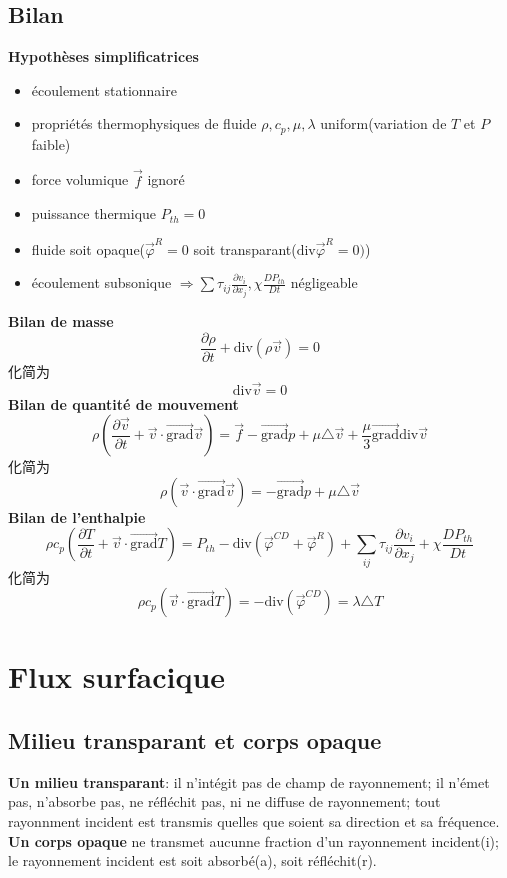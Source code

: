 \documentclass[openany]{book}
\begin{document}
\subsection{Bilan}
\textbf{Hypoth\`eses simplificatrices}
\begin{itemize}
\item \'ecoulement stationnaire
\item propri\'et\'es thermophysiques de fluide $\rho, c_p, \mu,\lambda $ uniform(variation de $T$ et $P$ faible)
\item force volumique $\vec{f}$ ignor\'e
\item puissance thermique $P_{th}=0$
\item fluide soit opaque($\vec{\varphi}^R = 0$ soit transparant($\mbox{div} \vec{\varphi}^R=0)$)
\item \'ecoulement subsonique $\Rightarrow \sum \tau_{ij}\frac{\partial  v_i}{\partial x_j},\chi\frac{ DP_{th}}{Dt}$ n\'egligeable
\end{itemize}
\textbf{Bilan de masse}
$$\frac{\partial  \rho}{\partial t} + \mbox{div} (\rho \vec{v})=0 $$
化简为
$$\mbox{div} \vec{v}=0$$
\textbf{Bilan de quantit\'e de mouvement}
$$
\rho(\frac{\partial  \vec{v}}{\partial t}+ \vec{v}\cdot \vec{\mbox{grad}}\vec{v}) =  \vec{f} - \vec{\mbox{grad}} p + \mu \triangle\vec{v} + \frac{\mu}{3}\vec{\mbox{grad}} \mbox{div} \vec{v}
$$
化简为
$$
\rho(  \vec{v}\cdot \vec{\mbox{grad}}\vec{v}) =   - \vec{\mbox{grad}} p + \mu \triangle\vec{v}
$$
\textbf{Bilan de l'enthalpie}
$$
\rho c_p (\frac{\partial  T}{\partial t} + \vec{v}\cdot \vec{\mbox{grad}} T)=P_{th} - \mbox{div} (\vec{\varphi}^{CD}+\vec{\varphi}^R) +  \sum_{ij} \tau_{ij}\frac{\partial  v_i}{\partial x_j} + \chi\frac{ DP_{th}}{Dt}
$$
化简为
$$
\rho c_p ( \vec{v}\cdot \vec{\mbox{grad}} T)=- \mbox{div} (\vec{\varphi}^{CD}) =\lambda \triangle T
$$


\section{Flux surfacique}
\subsection{Milieu transparant et corps opaque}
\textbf{Un milieu transparant}: il n'int\'egit pas de champ de rayonnement; il n'\'emet pas, n'absorbe pas, ne r\'efl\'echit pas, ni ne diffuse de rayonnement; tout rayonnment incident est transmis quelles que soient sa direction et sa fr\'equence.\\
\textbf{Un corps opaque} ne transmet aucunne fraction d'un rayonnement incident(i); le rayonnement incident est soit absorb\'e(a), soit r\'efl\'echit(r).
\end{document}
